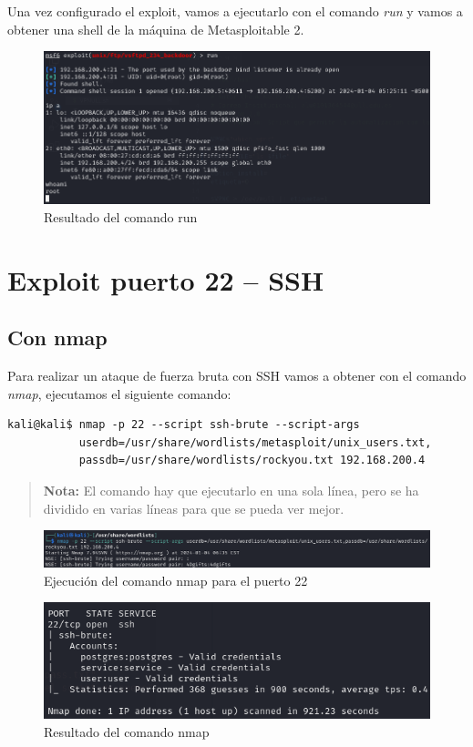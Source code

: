 \documentclass[11pt]{report}
\begin{document}
Una vez configurado el exploit, vamos a ejecutarlo con el comando \emph{run} y vamos a obtener una shell de la máquina de Metasploitable 2.
\begin{figure}[H]
  \centering
  \includegraphics[scale=0.6]{img/run_vsftpd.png}
  \caption{Resultado del comando run}
\end{figure}

\newpage

\section{Exploit puerto 22 – SSH}
\subsection{Con nmap}
Para realizar un ataque de fuerza bruta con SSH vamos a obtener con el comando \emph{nmap}, ejecutamos el siguiente comando:
\begin{verbatim}
kali@kali$ nmap -p 22 --script ssh-brute --script-args 
           userdb=/usr/share/wordlists/metasploit/unix_users.txt,
           passdb=/usr/share/wordlists/rockyou.txt 192.168.200.4
\end{verbatim}

\begin{quote}
  \textbf{Nota:} El comando hay que ejecutarlo en una sola línea, pero se ha dividido en varias líneas para que se pueda ver mejor.
\end{quote}

\begin{figure}[H]
  \centering
  \includegraphics[scale=0.63]{img/nmap_ssh.png}
  \caption{Ejecución del comando nmap para el puerto 22}
\end{figure}

\begin{figure}[H]
  \centering
  \includegraphics[scale=0.7]{img/nmap_ssh_result.png}
  \caption{Resultado del comando nmap}
\end{figure}
\end{document}
